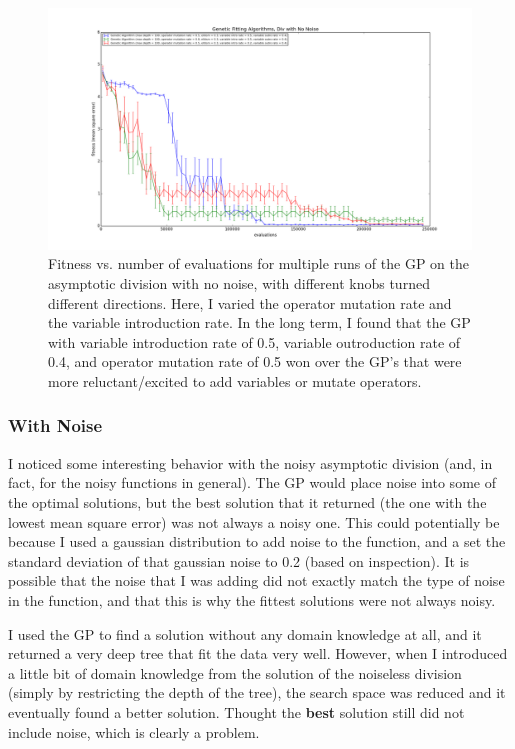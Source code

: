 \documentclass[11pt,amsmath,amssymb]{revtex4}
\begin{document}
\begin{figure}[H]
\center
\includegraphics[scale=0.35]{Div_No_Noise_Comparison.png}
\caption{Fitness vs. number of evaluations for multiple runs of the GP on the asymptotic division with no noise, with different knobs turned different directions. Here, I varied the operator mutation rate and the variable introduction rate. In the long term, I found that the GP with variable introduction rate of 0.5, variable outroduction rate of 0.4, and operator mutation rate of 0.5 won over the GP's that were more reluctant/excited to add variables or mutate operators.}
\label{q1}
\end{figure}


\subsubsection{With Noise}
I noticed some interesting behavior with the noisy asymptotic division (and, in fact, for the noisy functions in general). The GP would place noise into some of the optimal solutions, but the best solution that it returned (the one with the lowest mean square error) was not always a noisy one. This could potentially be because I used a gaussian distribution to add noise to the function, and a set the standard deviation of that gaussian noise to 0.2 (based on inspection). It is possible that the noise that I was adding did not exactly match the type of noise in the function, and that this is why the fittest solutions were not always noisy.

I used the GP to find a solution without any domain knowledge at all, and it returned a very deep tree that fit the data very well. However, when I introduced a little bit of domain knowledge from the solution of the noiseless division (simply by restricting the depth of the tree), the search space was reduced and it eventually found a better solution. Thought the {\bf{best}} solution still did not include noise, which is clearly a problem.
\end{document}

